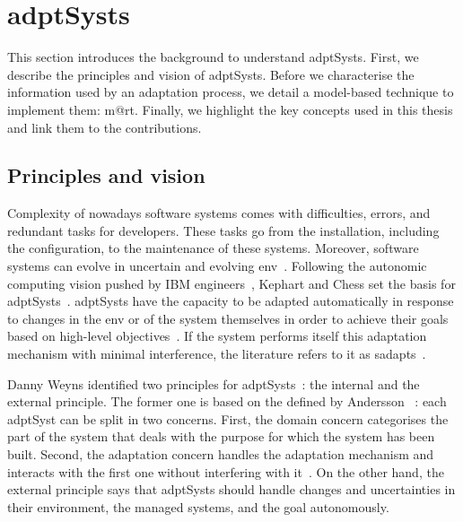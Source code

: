 \section[Adaptive systems]{\Glspl{adptSyst}}
\label{sec:back:adapt-syst}

This section introduces the background to understand \glspl{adptSyst}.
First, we describe the principles and vision of \glspl{adptSyst}.
Before we characterise the information used by an adaptation process, we detail a model-based technique to implement them: \gls{m@rt}.
Finally, we highlight the key concepts used in this thesis and link them to the contributions.

\subsection{Principles and vision}
Complexity of nowadays software systems comes with difficulties, errors, and redundant tasks for developers.
These tasks go from the installation, including the configuration, to the maintenance of these systems.
Moreover, software systems can evolve in uncertain and evolving \gls{env}~\cite{DBLP:conf/dagstuhl/EsfahaniM10}.
Following the autonomic computing vision pushed by IBM engineers~\cite{computing2006architectural}, Kephart and Chess set the basis for \glspl{adptSyst}~\cite{DBLP:journals/computer/KephartC03}.
\Glspl{adptSyst} have the capacity to be adapted automatically in response to changes in the \gls{env} or of the system themselves in order to achieve their goals based on high-level objectives~\cite{DBLP:conf/dagstuhl/ChengLGIMABBBCSDFGGGKKKLMMMPSTTWW09}.
If the system performs itself this adaptation mechanism with minimal interference, the literature refers to it as \glspl{sadapt}~\cite{DBLP:conf/dagstuhl/BrunSGGKLMPS09}.

Danny Weyns	identified two principles for \glspl{adptSyst}~\cite{DBLP:books/sp/19/Weyns19}: the internal and the external principle.
The former one is based on the  defined by Andersson \etal ~\cite{DBLP:conf/icse/AnderssonLMW09}: each \gls{adptSyst} can be split in two concerns.
First, the domain concern categorises the part of the system that deals with the purpose for which the system has been built.
Second, the adaptation concern handles the adaptation mechanism and interacts with the first one without interfering with it~\cite{DBLP:journals/tse/KramerM90}.
On the other hand, the external principle says that \glspl{adptSyst} should handle changes and uncertainties in their environment, the managed systems, and the goal autonomously.

